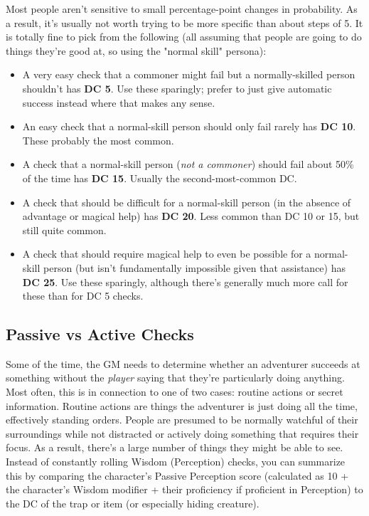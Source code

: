 \documentclass[10pt,twoside,openany,bg=none]{dndbook}
\begin{document}
Most people aren't sensitive to small percentage-point changes in probability. As a result, it's usually not worth trying to be more specific than about steps of 5. It is totally fine to pick from the following (all assuming that people are going to do things they're good at, so using the "normal skill" persona):
\begin{itemize}
    \item A very easy check that a commoner might fail but a normally-skilled person shouldn't has \textbf{DC 5}. Use these sparingly; prefer to just give automatic success instead where that makes any sense.
    \item An easy check that a normal-skill person should only fail rarely has \textbf{DC 10}. These probably the most common.
    \item A check that a normal-skill person (\textit{not a commoner}) should fail about 50\% of the time has \textbf{DC 15}. Usually the second-most-common DC.
    \item A check that should be difficult for a normal-skill person (in the absence of advantage or magical help) has \textbf{DC 20}. Less common than DC 10 or 15, but still quite common.
    \item A check that should require magical help to even be possible for a normal-skill person (but isn't fundamentally impossible given that assistance) has \textbf{DC 25}. Use these sparingly, although there's generally much more call for these than for DC 5 checks.
\end{itemize}

\subsection{Passive vs Active Checks}
Some of the time, the GM needs to determine whether an adventurer succeeds at something without the \textit{player} saying that they're particularly doing anything. Most often, this is in connection to one of two cases: routine actions or secret information. Routine actions are things the adventurer is just doing all the time, effectively standing orders. People are presumed to be normally watchful of their surroundings while not distracted or actively doing something that requires their focus. As a result, there's a large number of things they might be able to see. Instead of constantly rolling Wisdom (Perception) checks, you can summarize this by comparing the character's Passive Perception score (calculated as 10 + the character's Wisdom modifier + their proficiency if proficient in Perception) to the DC of the trap or item (or especially hiding creature).
\end{document}

